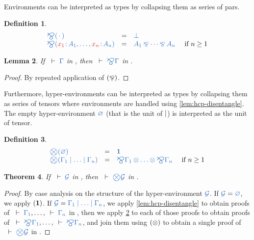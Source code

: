 \documentclass[submission,copyright,creativecommons]{eptcs}
\newtheorem{lemma}{Lemma}
\newtheorem{theorem}[lemma]{Theorem}
\newtheorem{definition}[lemma]{Definition}
\begin{document}
Environments can be interpreted as types by collapsing them as series of pars.
\begin{definition}\label{def:bigparr}
  \[
  \begin{array}{lcll}
    \ty{\bigparr(\emptycontext)}
    & = & \ty{\bot}
    \\
    \ty{\bigparr(\tmty{x_1}{A_1} , \dots , \tmty{x_n}{A_n})} 
     & = & \ty{A_1 \parr \dots \parr A_n}
     & \text{ if } n \geq 1
    \\
  \end{array}
  \]
\end{definition}\noindent
\begin{lemma}\label{lem:cp-bigparr}
  If $\seq{\Gamma}$ in \cp, then $\seq{\bigparr\Gamma}$ in \cp.
\end{lemma}\vspace*{-0.75\baselineskip}%
\begin{proof}
  By repeated application of $(\mathbin{\bindnasrepma})$.
\end{proof}\noindent
Furthermore, hyper-environments can be interpreted as types by collapsing them as series of tensors where environments are handled using \cref{lem:hcp-disentangle}. The empty hyper-environment $\ty{\emptyhypercontext}$ (that is the unit of $\mid$) is interpreted as the unit of tensor.
\begin{definition}\label{def:bigtens}
  \[
  \begin{array}{lcll}
    \ty{\bigtens(\emptyhypercontext)}
    & = & \ty{\one}
    \\
    \ty{\bigtens(\Gamma_1 \hsep \dots \hsep \Gamma_n)}
    & = & \ty{\bigparr\Gamma_1 \tens \dots \tens \bigparr\Gamma_n}
    & \text{ if } n \geq 1
  \end{array}
  \]
\end{definition}\noindent

\begin{theorem}\label{thm:hcp2cp-bigtens}
  If $\seq{\mathcal{G}}$ in \hcp, then $\seq{\bigtens\mathcal{G}}$ in \cp.
\end{theorem}\vspace*{-0.75\baselineskip}%
\begin{proof}
  By case analysis on the structure of the hyper-environment $\ty{\mathcal{G}}$.
  If $\ty{\mathcal{G}} = \ty{\emptyhypercontext}$, we apply $(\mathbf{1})$.
  If $\ty{\mathcal{G}} = \ty{\Gamma_1 \hsep \dots \hsep \Gamma_n}$, we apply \cref{lem:hcp-disentangle} to obtain proofs of $\seq{\Gamma_1}, \dots, \seq{\Gamma_n}$ in \cp, then we apply \cref{lem:cp-bigparr} to each of those proofs to obtain proofs of $\seq{\bigparr\Gamma_1}, \dots, \seq{\bigparr\Gamma_n}$, and join them using $(\otimes)$ to obtain a single proof of $\seq{\bigtens\mathcal{G}}$ in \cp.
\end{proof}\noindent
\end{document}
